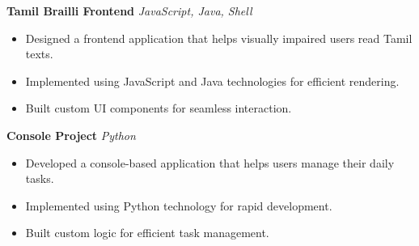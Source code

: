 \documentclass[a4paper,12pt]{article}
\begin{document}
\textbf{Tamil Brailli Frontend}  
\textit{JavaScript, Java, Shell}
\begin{itemize}
    \item Designed a frontend application that helps visually impaired users read Tamil texts.
    \item Implemented using JavaScript and Java technologies for efficient rendering.
    \item Built custom UI components for seamless interaction.
\end{itemize}

\textbf{Console Project}  
\textit{Python}
\begin{itemize}
    \item Developed a console-based application that helps users manage their daily tasks.
    \item Implemented using Python technology for rapid development.
    \item Built custom logic for efficient task management.
\end{itemize}
\end{document}
